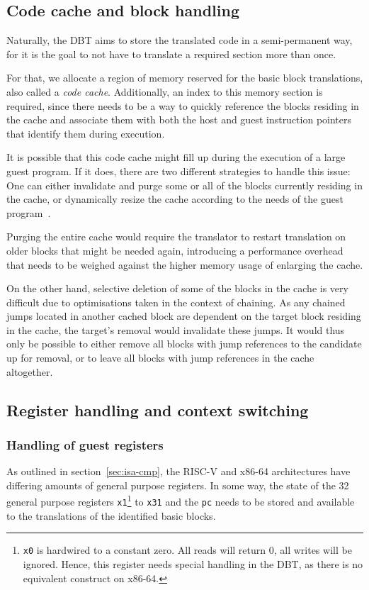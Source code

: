 \subsection{Code cache and block handling}
Naturally, the DBT aims to store the translated code in a semi-permanent way, for it is the goal to not have to translate a required section more than once.

For that, we allocate a region of memory reserved for the basic block translations, also called a \textit{code cache}.
Additionally, an index to this memory section is required, since there needs to be a way to quickly reference the blocks residing in the cache and associate them with both the host and guest instruction pointers that identify them during execution.


It is possible that this code cache might fill up during the execution of a large guest program.
If it does, there are two different strategies to handle this issue:
One can either invalidate and purge some or all of the blocks currently residing in the cache, or dynamically resize the cache according to the needs of the guest program~\cite[S. 3]{bintrans}.

Purging the entire cache would require the translator to restart translation on older blocks that might be needed again, introducing a performance overhead that needs to be weighed against the higher memory usage of enlarging the cache.

On the other hand, selective deletion of some of the blocks in the cache is very difficult due to optimisations taken in the context of chaining.
As any chained jumps located in another cached block are dependent on the target block residing in the cache, the target's removal would invalidate these jumps.
It would thus only be possible to either remove all blocks with jump references to the candidate up for removal, or to leave all blocks with jump references in the cache altogether.

\subsection{Register handling and context switching}
\label{sec:context-switch-reg-handle}

\subsubsection{Handling of guest registers}
\label{sec:reg-handle}
As outlined in section~\ref{sec:isa-cmp}, the RISC-V and x86-64 architectures have differing amounts of general purpose registers.
In some way, the state of the 32 general purpose registers \texttt{x1}\footnote{\texttt{x0} is hardwired to a constant zero. All reads will return 0, all writes will be ignored. Hence, this register needs special handling in the DBT, as there is no equivalent construct on x86-64.} to \texttt{x31} and the \texttt{pc} needs to be stored and available to the translations of the identified basic blocks.

